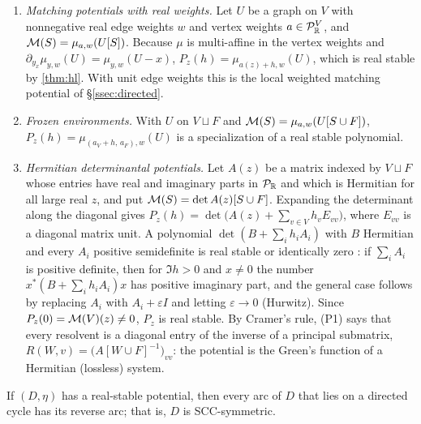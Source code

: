 \begin{example}\label{ex:real-stable}
\begin{enumerate}[label=(\alph*)]
\item \emph{Matching potentials with real weights.} Let $U$ be a graph on $V$ with nonnegative real edge weights $w$ and vertex weights $a\in\mathcal{P}_{\mathbb{R}}^V$, and $\mathcal{M}(S)=\mu_{a,w}(U[S])$. Because $\mu$ is multi-affine in the vertex weights and $\partial_{y_x}\mu_{y,w}(U)=\mu_{y,w}(U-x)$, $P_z(h)=\mu_{a(z)+h,w}(U)$, which is real stable by \cref{thm:hl}. With unit edge weights this is the local weighted matching potential of \S\ref{ssec:directed}.
\item \emph{Frozen environments.} With $U$ on $V\sqcup F$ and $\mathcal{M}(S)=\mu_{a,w}(U[S\cup F])$, $P_z(h)=\mu_{(a_V+h,\,a_F),w}(U)$ is a specialization of a real stable polynomial.
\item \emph{Hermitian determinantal potentials.} Let $A(z)$ be a matrix indexed by $V\sqcup F$ whose entries have real and imaginary parts in $\mathcal{P}_{\mathbb{R}}$ and which is Hermitian for all large real $z$, and put $\mathcal{M}(S)=\det A(z)[S\cup F]$. Expanding the determinant along the diagonal gives $P_z(h)=\det\bigl(A(z)+\sum_{v\in V}h_vE_{vv}\bigr)$, where $E_{vv}$ is a diagonal matrix unit. A polynomial $\det(B+\sum_ih_iA_i)$ with $B$ Hermitian and every $A_i$ positive semidefinite is real stable or identically zero \cite[Prop.~2.4]{BorceaBranden}: if $\sum_iA_i$ is positive definite, then for $\Im h>0$ and $x\neq0$ the number $x^{*}(B+\sum_ih_iA_i)x$ has positive imaginary part, and the general case follows by replacing $A_i$ with $A_i+\varepsilon I$ and letting $\varepsilon\to0$ (Hurwitz). Since $P_z(0)=\mathcal{M}(V)(z)\neq0$, $P_z$ is real stable. By Cramer's rule, \textup{(P1)} says that every resolvent is a diagonal entry of the inverse of a principal submatrix, $R(W,v)=\bigl(A[W\cup F]^{-1}\bigr)_{vv}$: the potential is the Green's function of a Hermitian (lossless) system.
\end{enumerate}
\end{example}

\begin{theorem}\label{thm:main-real}
If $(D,\eta)$ has a real-stable potential, then every arc of $D$ that lies on a directed cycle has its reverse arc; that is, $D$ is SCC-symmetric.
\end{theorem}


